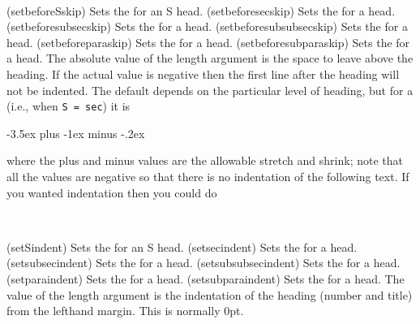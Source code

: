 \begin{syntax}
\cmd{\setbeforeSskip} \\
\end{syntax}
\glossary(setbeforeSskip)%
  {}%
  {Sets the  for an S head.}
\glossary(setbeforesecskip)%
  {}%
  {Sets the  for a  head.}
\glossary(setbeforesubsecskip)%
  {}%
  {Sets the  for a  head.}
\glossary(setbeforesubsubsecskip)%
  {}%
  {Sets the  for a  head.}
\glossary(setbeforeparaskip)%
  {}%
  {Sets the  for a  head.}
\glossary(setbeforesubparaskip)%
  {}%
  {Sets the  for a  head.}
The absolute value of the  length argument is the space to leave
above the heading. If the actual value is negative then the first line
after the heading will not be indented. The default  depends on the
particular level of heading, but for a \cmd{\section}
(i.e., when \verb?S = sec?) it is
\begin{lcode}
-3.5ex plus -1ex minus -.2ex
\end{lcode}
where the plus and minus values are the
allowable stretch and shrink; note that all the values are negative so that
there is no indentation of the following text. If you wanted indentation then
you could do
\begin{lcode}
\end{lcode}


\begin{syntax}
\cmd{\setSindent} \\
\end{syntax}
\glossary(setSindent)
  {}%
  {Sets the  for an S head.}
\glossary(setsecindent)
  {}%
  {Sets the  for a  head.}
\glossary(setsubsecindent)
  {}%
  {Sets the  for a  head.}
\glossary(setsubsubsecindent)
  {}%
  {Sets the  for a  head.}
\glossary(setparaindent)
  {}%
  {Sets the  for a  head.}
\glossary(setsubparaindent)
  {}%
  {Sets the  for a  head.}
The value of the  length argument is the indentation of
the heading (number and title) from the lefthand margin.
This is normally 0pt.

